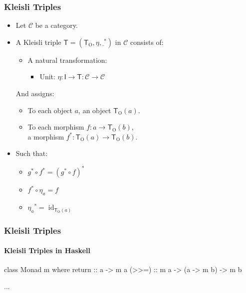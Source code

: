 \documentclass{beamer}
\DeclareMathOperator{\obj}{O}
\DeclareMathOperator{\id}{id}
\newcommand{\idO}[1]{\natO{\id}{#1}}
\newcommand{\comp}{\ensuremath{\mathrel{\circ}}}
\newcommand{\cat}[1]{\ensuremath{\mathcal{#1}}}
\newcommand{\func}[1]{\ensuremath{\mathsf{#1}}}
\newcommand{\funcO}[1]{\ensuremath{\func{#1}_{\obj}}}
\newcommand{\nat}[1]{\ensuremath{#1}}
\newcommand{\natO}[2]{\ensuremath{\nat{#1}_{#2}}}
\newcommand{\underscore}{\ensuremath{\underline{\ }}}
\newcommand{\mon}[1]{\func{#1}}
\newcommand{\monM}[2]{\ensuremath{#2^*}}
\begin{document}
\begin{frame}
  \frametitle{Kleisli Triples}

  \begin{definition}
    \begin{itemize}
    \item
      Let \cat{C} be a category.
    \item
      A Kleisli triple $\mon{T} = (\funcO{T}, \nat{\eta},
      \monM{T}{\underscore})$ in $\cat{C}$ consists of:
      \begin{itemize}
      \item
        A natural transformation:
        \begin{itemize}
        \item
          Unit: $\nat{\eta}: \func{I} \to \func{T}: \cat{C} \to
          \cat{C}$
        \end{itemize}
      \end{itemize}
      And assigns:
      \begin{itemize}
      \item
        To each object $a$, an object $\funcO{T}(a)$.
      \item
        To each morphism $f: a \to \funcO{T}(b)$,\\ a morphism
        $\monM{T}{f}: \funcO{T}(a) \to \funcO{T}(b)$.
      \end{itemize}
    \item
      Such that:
      \begin{itemize}
      \item
        $\monM{T}{g} \comp \monM{T}{f} = \monM{T}{(\monM{T}{g} \comp
        f)}$
      \item
        $\monM{T}{f} \comp \natO{\eta}{a} = f$
      \item
        $\monM{T}{\natO{\eta}{a}} = \idO{\funcO{T}(a)}$
      \end{itemize}
    \end{itemize}
  \end{definition}

\end{frame}


\begin{frame}[fragile]
  \frametitle{Kleisli Triples}
  \framesubtitle{Kleisli Triples in Haskell}

  \begin{definition}
    \begin{code}
class Monad m where
  return :: a -> m a
  (>>=)  :: m a -> (a -> m b) -> m b

  ...
    \end{code}
  \end{definition}

\end{frame}
\end{document}
